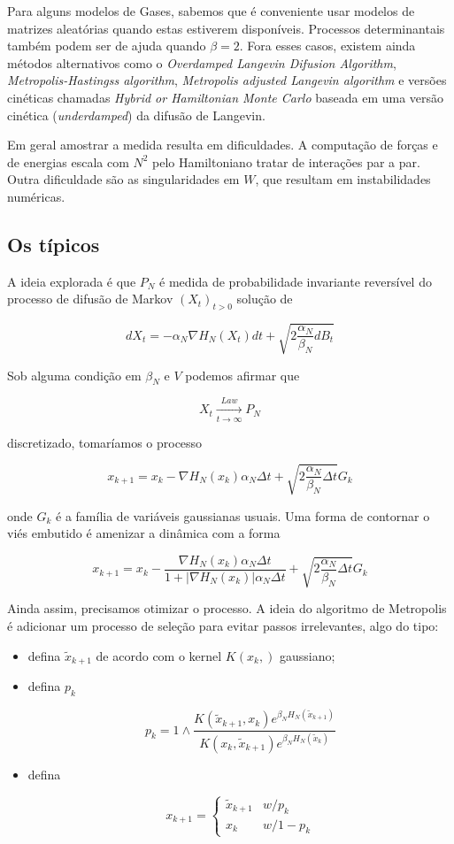 Para alguns modelos de Gases, sabemos que é conveniente usar modelos de matrizes aleatórias quando estas estiverem disponíveis. Processos determinantais também podem ser de ajuda quando $\beta = 2$. Fora esses casos, existem ainda métodos alternativos como o \textit{Overdamped Langevin Difusion Algorithm}, \textit{Metropolis-Hastingss algorithm}, \textit{Metropolis adjusted Langevin algorithm} e versões cinéticas chamadas \textit{Hybrid or Hamiltonian Monte Carlo} baseada em uma versão cinética (\textit{underdamped}) da difusão de Langevin.

Em geral amostrar a medida resulta em dificuldades. A computação de forças e de energias escala com $N^2$ pelo Hamiltoniano tratar de interações par a par. Outra dificuldade são as singularidades em $W$, que resultam em instabilidades numéricas.

\subsection{Os típicos}

A ideia explorada é que $P_N$ é medida de probabilidade invariante reversível do processo de difusão de Markov $(X_t)_{t>0}$ solução de

\[
dX_t = -\alpha_N \nabla H_N(X_t) dt + \sqrt{2\frac{\alpha_N}{\beta_N} dB_t}
\]

Sob alguma condição em $\beta_N$ e $V$ podemos afirmar que

\[
X_t \xrightarrow[t \rightarrow \infty]{Law} P_N
\]

discretizado, tomaríamos o processo

\[
x_{k+1} = x_k - \nabla H_N(x_k) \alpha_N \Delta t + \sqrt{2\frac{\alpha_N}{\beta_N} \Delta t} G_k
\]

onde $G_k$ é a família de variáveis gaussianas usuais. Uma forma de contornar o viés embutido é amenizar a dinâmica com a forma

\[
x_{k+1} = x_k - \frac{\nabla H_N(x_k) \alpha_N \Delta t}{1 + |\nabla H_N(x_k)| \alpha_N \Delta t} + \sqrt{2\frac{\alpha_N}{\beta_N} \Delta t} G_k
\]


Ainda assim, precisamos otimizar o processo. A ideia do algoritmo de Metropolis é adicionar um processo de seleção para evitar passos irrelevantes, algo do tipo:

\begin{itemize}
	\item defina $\tilde{x}_{k+1}$ de acordo com o kernel $K(x_k,)$ gaussiano;
	
	\item defina $p_k$
	
	\[
	p_k = 1 \wedge \frac{K(\tilde{x}_{k+1},x_k) e^{\beta_N H_N(\tilde{x}_{k+1})}}{K(x_{k},\tilde{x}_{k+1}) e^{\beta_N H_N(\tilde{x}_{k})}}
	\]
	
	\item defina
	
	\[
	x_{k+1} = 
	\begin{cases}
		\tilde{x}_{k+1} & w/ p_k \\
		x_k & w/ 1-p_k
	\end{cases}
	\]
	
\end{itemize}

